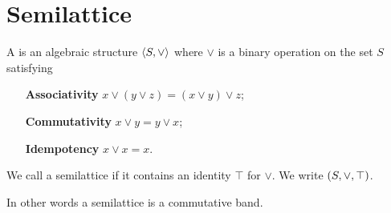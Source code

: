 \section{Semilattice}
\begin{definition}
A  is an algebraic structure $\langle S,\vee \rangle$ where $\vee$ is a binary operation on the set $S$ satisfying
\begin{itemize}[leftmargin=2.5cm]
\item[\textbf{Associativity}] $x\vee (y\vee z) = (x\vee y) \vee z$;
\item[\textbf{Commutativity}] $x \vee y = y \vee x$;
\item[\textbf{Idempotency}] $x\vee x = x$.
\end{itemize}
We call a semilattice  if it contains an identity $\top$ for $\vee$. We write $\left( S, \vee, \top \right)$.
\end{definition}
In other words a semilattice is a commutative band.

